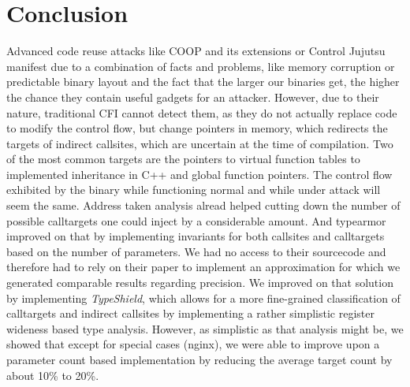 \chapter{Conclusion}
\label{chapter:Conclusion}
Advanced code reuse attacks like COOP and its extensions or Control Jujutsu manifest due to a combination of facts and problems, like memory corruption or predictable binary layout and the fact that the larger our binaries get, the higher the chance they contain useful gadgets for an attacker. However, due to their nature, traditional CFI cannot detect them, as they do not actually replace code to modify the control flow, but change pointers in memory, which redirects the targets of indirect callsites, which are uncertain at the time of compilation. Two of the most common targets are the pointers to virtual function tables to implemented inheritance in C++ and global function pointers. The control flow exhibited by the binary while functioning normal and while under attack will seem the same. Address taken analysis alread helped cutting down the number of possible calltargets one could inject by a considerable amount. And typearmor improved on that by implementing invariants for both callsites and calltargets based on the number of parameters. We had no access to their sourcecode and therefore had to rely on their paper to implement an approximation for which we generated comparable results regarding precision. We improved on that solution by implementing \textit{TypeShield}, which allows for a more fine-grained classification of calltargets and indirect callsites by implementing a rather simplistic register wideness based type analysis. However, as simplistic as that analysis might be, we showed that except for special cases (nginx), we were able to improve upon a parameter count based implementation by reducing the average target count by about 10\% to 20\%.


